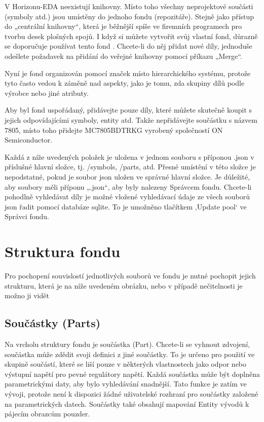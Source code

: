 \documentclass[letterpaper,10pt,czech]{sphinxmanual}
\begin{document}
V Horizonu-EDA neexistují knihovny. Místo toho všechny neprojektové součásti (symboly atd.) jsou umístěny do jednoho fondu (repozitáře). Stejně jako přístup do „centrální knihovny“, která je běžnější spíše ve firemních programech pro tvorbu desek plošných spojů. I když si můžete vytvořit svůj vlastní fond, důrazně se doporučuje používat tento fond
. Chcete-li do něj přidat nové díly, jednoduše odešlete požadavek na přidání do veřejné knihovny pomocí příkazu „Merge“.

Nyní je fond organizován pomocí značek místo hierarchického
systému, protože tyto často vedou k záměně nad aspekty, jako je tomu, zda
skupiny dílů podle výrobce nebo jiné atributy.

Aby byl fond uspořádaný, přidávejte pouze díly, které můžete skutečně koupit s jejich odpovídajícími symboly, entity atd. Takže nepřidávejte součástku s názvem 7805, místo toho přidejte MC7805BDTRKG vyrobený společností ON Semiconductor.

Každá z níže uvedených položek je uložena v jednom souboru s příponou .json v příslušné hlavní složce, tj. /symbols, /parts, atd. Přesné umístění v této složce je nepodstatné, pokud je soubor json uložen ve
správné hlavní složce. Je důležité, aby soubory měli příponu „.json“, aby byly nalezeny Správcem fondu. Chcete-li pohodlně vyhledávat díly je možné vložené vyhledávací údaje ze všech souborů json řadit pomocí databáze sqlite. To je umožněno tlačítkem ‚Update pool‘ ve Správci fondu.


\section{Struktura fondu}
\label{\detokenize{pool-elements:struktura-fondu}}
Pro pochopení souvislostí jednotlivých souborů ve fondu je nutné pochopit jejich strukturu, která je na níže uvedeném obrázku, nebo v případě nečitelnosti je možno ji vidět

\noindent{}


\subsection{Součástky (Parts)}
\label{\detokenize{pool-elements:soucastky-parts}}
Na vrcholu struktury fondu je součástka (Part). Chcete-li se vyhnout zdvojení,
součástka může zdědit svoji definici z jiné součástky. To je určeno pro použití ve skupině součástí, které se liší pouze v některých vlastnostech jako odpor nebo výstupní napětí pro pevné regulátory napětí. Každá součástka může být doplněna parametrickými daty, aby bylo vyhledávání snadnější. Tato funkce je zatím ve vývoji, protože není k dispozici žádné uživatelské rozhraní pro součástky založené na parametrických datech. Součástky také obsahují mapování Entity vývodů k pájecím obrazcům pouzder.
\end{document}
